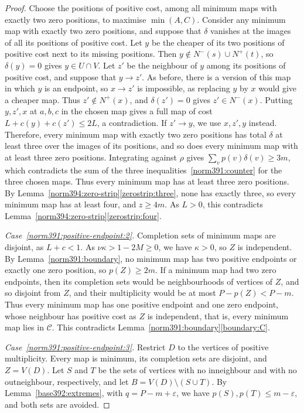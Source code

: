 \begin{proof}
Choose the positions of positive cost, among all minimum maps with exactly two zero positions, to maximise $\min(A,C)$. Consider any minimum map with exactly two zero positions, and suppose that $\delta$ vanishes at the images of all its positions of positive cost. Let $y$ be the cheaper of its two positions of positive cost next to its missing positions. Then $y\notin N^-(s)\cup N^+(t)$, so $\delta(y)=0$ gives $y\in U\cap V$. Let $z'$ be the neighbour of $y$ among its positions of positive cost, and suppose that $y\to z'$. As before, there is a version of this map in which $y$ is an endpoint, so $x\to z'$ is impossible, as replacing $y$ by $x$ would give a cheaper map. Thus $z'\notin N^+(x)$, and $\delta(z')=0$ gives $z'\in N^-(x)$. Putting $y,z',x$ at $a,b,c$ in the chosen map gives a full map of cost $L+c(y)+c(z')\le2L$, a contradiction. If $z'\to y$, we use $x,z',y$ instead.
Therefore, every minimum map with exactly two zero positions has total $\delta$ at least three over the images of its positions, and so does every minimum map with at least three zero positions. Integrating against $\rho$ gives $\sum_vp(v)\delta(v)\ge3m$, which contradicts the sum of the three inequalities~\eqref{norm391:counter} for the three chosen maps.
Thus every minimum map has at least three zero positions. By Lemma~\ref{norm394:zero-strip}\ref{zerostrip:three}, none has exactly three, so every minimum map has at least four, and $z\ge4m$. As $L>0$, this contradicts Lemma~\ref{norm394:zero-strip}\ref{zerostrip:four}.

\emph{Case~\ref{norm391:positive-endpoint:2}.}
Completion sets of minimum maps are disjoint,
as $L+c<1$. As $\nu\kappa>1-2M\ge0$, we have $\kappa>0$, so $Z$
is independent. By Lemma~\ref{norm391:boundary}, no minimum map has two positive endpoints or exactly one zero position, so $p(Z)\ge2m$. If a minimum map had two zero endpoints, then its completion sets would be neighbourhoods of vertices of $Z$, and so disjoint from $Z$, and their multiplicity would be at most $P-p(Z)<P-m$. Thus every minimum map has one positive endpoint and one zero endpoint, whose neighbour has positive cost as $Z$ is independent, that is, every minimum map lies in $\mathcal C$. This contradicts Lemma~\ref{norm391:boundary}\ref{boundary:C}.

\emph{Case~\ref{norm391:positive-endpoint:3}.}
Restrict $D$ to the vertices of positive multiplicity. Every map is minimum, its completion sets are disjoint, and $Z=V(D)$.
Let $S$ and $T$ be the sets of vertices with no inneighbour and with no outneighbour, respectively, and let $B=V(D)\setminus(S\cup T)$.
By Lemma~\ref{base392:extremes}, with $q=P-m+\varepsilon$, we have
$p(S),p(T)\le m-\varepsilon$, and both sets are avoided.


\end{proof}
